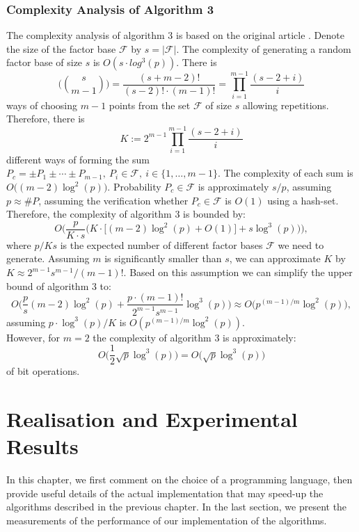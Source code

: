 \documentclass[thesis=M,english]{FITthesis}[2012/10/20]
\theoremstyle{remark}
\theoremstyle{definition}
\begin{document}
\subsection{Complexity Analysis of Algorithm 3}
The complexity analysis of algorithm 3 is based on the original article \cite{guire}.
Denote the size of the factor base $\mathcal{F}$ by $s = |\mathcal{F}|$. The complexity of generating a random factor base of size $s$ is $O(s\cdot log^3(p))$. There is 
$$
\Bigg(\binom{s}{m-1}\Bigg) = \frac{(s + m - 2)!}{(s-2)!\cdot (m-1)!} = \prod_{i=1}^{m-1} \frac{(s -2 + i)}{i}
$$
ways of choosing $m-1$ points from the set $\mathcal{F}$ of size $s$ allowing repetitions. Therefore, there is
 $$
 K:= 2^{m-1}\prod_{i=1}^{m-1} \frac{(s -2 + i)}{i}
 $$
 different ways of forming the sum $P_c = \pm P_1 \pm \cdots \pm P_{m-1},\ P_i \in \mathcal{F},\ i \in \{1,\ldots,m-1\}.$ The complexity of each sum is $O\big((m-2)\log^2(p)\big)$. Probability $P_c \in \mathcal{F}$ is approximately $s/p$, assuming $p \approx \#P$, assuming the verification whether $P_c \in \mathcal{F}$ is $O(1)$ using a hash-set. Therefore, the complexity of algorithm 3 is bounded by:
 $$
 O\Bigg(\frac{p}{K\cdot s}\bigg( K\cdot\bigg[(m-2)\log^2(p)+ O(1)\bigg] + s\log^3(p)\bigg)\Bigg),
 $$
where $p/Ks$ is the expected number of different factor bases $\mathcal{F}$ we need to generate. Assuming $m$ is significantly smaller than $s$, we can approximate $K$ by $K \approx 2^{m-1}s^{m-1}/(m-1)!.$ Based on this assumption we can simplify the upper bound of algorithm 3 to:
$$
O\Bigg( \frac{p}{s}(m-2)\log^2(p) + \frac{p\cdot (m-1)!}{2^{m-1}s^{m-1}}\log^3(p)\Bigg) \approx O\Bigg(p^{(m-1)/m}\log^2(p)\Bigg),
$$
assuming $p\cdot \log^3(p)/K$ is $O(p^{(m-1)/m}\log^2(p))$.
\\
\noindent However, for $m=2$ the complexity of algorithm 3 is approximately:
$$
O\Bigg( \frac{1}{2}\sqrt{p}\log^3(p)\Bigg) = O\Bigg(\sqrt{p}\log^3(p)\Bigg)
$$ of bit operations. \\
\chapter{Realisation and Experimental Results}\label{ch4}
In this chapter, we first comment on the choice of a programming language, then provide useful details of the actual implementation that may speed-up the algorithms described in the previous chapter. In the last section, we present the measurements of the performance of our implementation of the algorithms.
\end{document}

